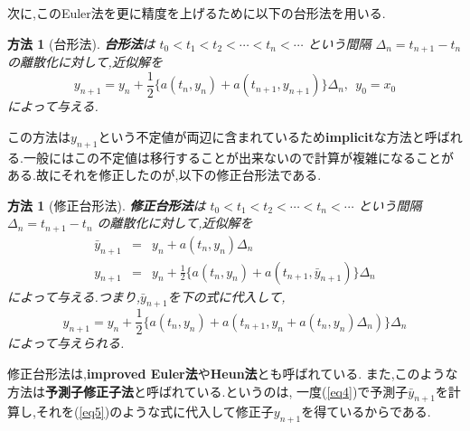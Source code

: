 \documentclass[a4paper,dvipdfmx]{jreport}
\numberwithin{equation}{section}
\newtheorem{Method}[Thm]{方法}
\renewenvironment{leftbar}{%
  \def\FrameCommand{\vrule width 1pt \hspace{10pt}}%
  \MakeFramed {\advance\hsize-\width \FrameRestore}}%
 {\endMakeFramed}
\def\method{\begin{leftbar}\begin{Method}}
\def\methodx{\end{Method}\end{leftbar}}
\def\eq{\begin{equation}}
\def\eqx{\end{equation}}
\def\eqa{\begin{eqnarray}}
\def\eqax{\end{eqnarray}}
\begin{document}
次に,このEuler法を更に精度を上げるために以下の台形法を用いる.
\method[台形法]
{\bf 台形法}は $ t_0 < t_1 < t_2 < \cdots < t_n < \cdots $ という間隔 $\Delta_n = t_{n+1} - t_{n}$ の離散化に対して,近似解を
\eq
\label{eq3}
y_{n+1} = y_n + \frac{1}{2} \{ a(t_n,y_n) + a(t_{n+1},y_{n+1}) \} \Delta_n,\  \  y_0 = x_0
\eqx
によって与える.
\methodx
この方法は$y_{n+1}$という不定値が両辺に含まれているため{\bf implicit}な方法と呼ばれる.一般にはこの不定値は移行することが出来ないので計算が複雑になることがある.故にそれを修正したのが,以下の修正台形法である.
\method[修正台形法]
{\bf 修正台形法}は $ t_0 < t_1 < t_2 < \cdots < t_n < \cdots $ という間隔 $\Delta_n = t_{n+1} - t_{n}$ の離散化に対して,近似解を
\eqa
\label{eq4}
\bar{y}_{n+1} &=& y_n + a(t_n,y_n)\Delta_n  \\
\label{eq5}
y_{n+1} &=& y_n + \frac{1}{2} \{ a(t_n,y_n) + a(t_{n+1},\bar{y}_{n+1}) \} \Delta_n 
\eqax
によって与える.つまり,$\bar{y}_{n+1}$を下の式に代入して,
\eq
\label{eq6}
y_{n+1} = y_n + \frac{1}{2} \{ a(t_n,y_n) + a(t_{n+1},y_n + a(t_n,y_n)\Delta_n) \} \Delta_n
\eqx
によって与えられる.
\methodx
修正台形法は,{\bf improved Euler法}や{\bf Heun法}とも呼ばれている.
また,このような方法は{\bf 予測子修正子法}と呼ばれている.というのは,
一度(\ref{eq4})で予測子$\bar{y}_{n+1}$を計算し,それを(\ref{eq5})のような式に代入して修正子$y_{n+1}$を得ているからである.\par
\end{document}
